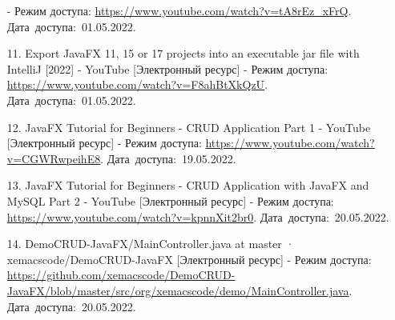 \documentclass[12pt, a4paper, simple]{eskdtext}
\begin{document}
\begin{enumerate}
        - Режим доступа: \url{https://www.youtube.com/watch?v=tA8rEz_xFrQ}.
        Дата~доступа:~01.05.2022.
        \item[11.] Export JavaFX 11, 15 or 17 projects into an executable jar file with IntelliJ [2022] - YouTube [Электронный ресурс]
        - Режим доступа: \url{https://www.youtube.com/watch?v=F8ahBtXkQzU}.
        Дата~доступа:~01.05.2022.
        \item[12.] JavaFX Tutorial for Beginners - CRUD Application Part 1 - YouTube [Электронный ресурс]
        - Режим доступа: \url{https://www.youtube.com/watch?v=CGWRwpeihE8}.
        Дата~доступа:~19.05.2022.
        \item[13.] JavaFX Tutorial for Beginners - CRUD Application  with JavaFX and MySQL Part 2 - YouTube [Электронный ресурс]
        - Режим доступа: \url{https://www.youtube.com/watch?v=kpnnXit2br0}.
        Дата~доступа:~20.05.2022.
        \item[14.] DemoCRUD-JavaFX/MainController.java at master · xemacscode/DemoCRUD-JavaFX [Электронный ресурс]
        - Режим доступа: \url{https://github.com/xemacscode/DemoCRUD-JavaFX/blob/master/src/org/xemacscode/demo/MainController.java}.
        Дата~доступа:~20.05.2022.
    \end{enumerate}
    \newpage
\end{document}

